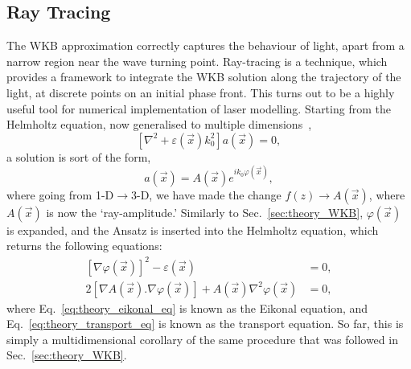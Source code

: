 \subsection{Ray Tracing}%
\label{sec:theory_rays}

The WKB approximation correctly captures the behaviour of light, apart from a narrow region near the wave turning point.
Ray-tracing is a technique, which provides a framework to integrate the WKB solution along the trajectory of the light, at discrete points on an initial phase front.
This turns out to be a highly useful tool for numerical implementation of laser modelling.
Starting from the Helmholtz equation, now generalised to multiple dimensions~\cite{colaitis_modeling_2014},
\begin{equation}
    \left[ \nabla^2 + \varepsilon(\vec{x})k_0^2 \right] a(\vec{x}) = 0,
\end{equation}
a solution is sort of the form,
\begin{equation}
    a(\vec{x}) = A(\vec{x}) e^{i k_0 \varphi(\vec{x})},
\end{equation}
where going from 1-D$\rightarrow$3-D, we have made the change $f(z)\rightarrow A(\vec{x})$, where $A(\vec{x})$ is now the `ray-amplitude.'
Similarly to Sec.~\ref{sec:theory_WKB}, $\varphi(\vec{x})$ is expanded, and the Ansatz is inserted into the Helmholtz equation, which returns the following equations:
\begin{align}
    \label{eq:theory_eikonal_eq}
    \left[\nabla \varphi(\vec{x})\right]^2  - \varepsilon(\vec{x}) &= 0,\\
    \label{eq:theory_transport_eq}
    2\left[\nabla A(\vec{x}) . \nabla \varphi (\vec{x}) \right] + A(\vec{x}) \nabla^2 \varphi(\vec{x}) &= 0,
\end{align}
where Eq.~\ref{eq:theory_eikonal_eq} is known as the Eikonal equation, and Eq.~\ref{eq:theory_transport_eq} is known as the transport equation.
So far, this is simply a multidimensional corollary of the same procedure that was followed in Sec.~\ref{sec:theory_WKB}.

